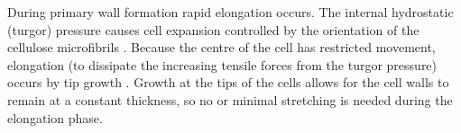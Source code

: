 During primary wall formation rapid elongation occurs. The internal hydrostatic (turgor) pressure causes cell expansion controlled by the orientation of the cellulose microfibrils \cite{Tyerman_2002} \cite{16261190}.
Because the centre of the cell has restricted movement, elongation
(to dissipate the increasing tensile forces from the turgor pressure)
occurs by
tip growth \cite{taiz2006plant}. Growth at the tips of the cells allows for the cell walls to
remain at a constant thickness, so no or minimal stretching is needed during the elongation
phase.